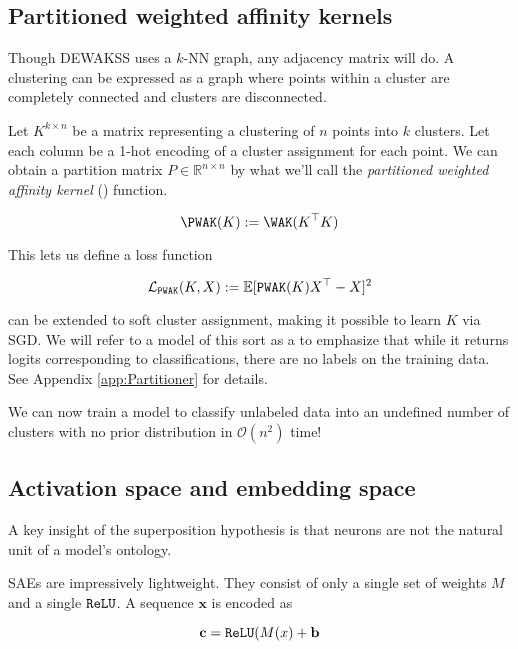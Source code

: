 \subsection{Partitioned weighted affinity kernels} 

Though DEWAKSS uses a $k$-NN graph, any adjacency matrix will do.
A clustering can be expressed as a graph where points within a cluster are completely connected and clusters are disconnected.

Let $K^{k \times n}$ be a matrix representing a clustering of $n$ points into $k$ clusters. Let each column be a 1-hot encoding of a cluster assignment for each point. We can obtain a partition matrix $P \in \mathbb{R}^{n \times n}$ by what we'll call the \textit{partitioned weighted affinity kernel} (\PWAK) function.

\begin{equation}
  \label{eq:PWAK}
  \PWAK(K) := \WAK(K^\top K)
\end{equation}

This lets us define a loss function

\begin{equation}
  \mathcal{L}_{\mathop{\mathtt{PWAK}}\limits}(K,X) := \mathbb{E}[\mathop{\mathtt{PWAK}}\limits(K)X^\top - X]^2
\end{equation}


\PWAK can be extended to soft cluster assignment, making it possible to learn $K$ via SGD.
We will refer to a model of this sort as a \Partitioner to emphasize that while it returns logits corresponding to classifications, there are no labels on the training data.
See Appendix \ref{app:Partitioner} for details.

We can now train a model to classify unlabeled data into an undefined number of clusters with no prior distribution in $\mathcal{O}(n^2)$ time!

\subsection{Activation space and embedding space}

A key insight of the superposition hypothesis is that neurons are not the natural unit of a model's ontology.

SAEs are impressively lightweight. They consist of only a single set of weights $M$ and a single $\mathop{\mathtt{ReLU}}\limits$. A sequence $\mathbf{x}$ is encoded as

\begin{equation}
  \mathbf{c} = \mathop{\mathtt{ReLU}}\limits(M\mathbf(x) + \mathbf{b}
\end{equation}

